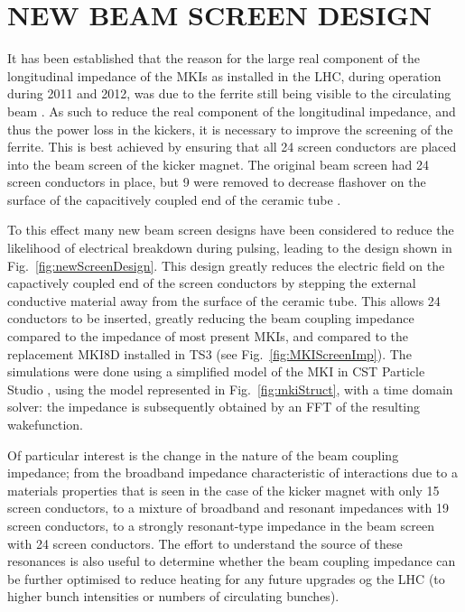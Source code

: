\documentclass{JAC2003}
\begin{document}
\section{NEW BEAM SCREEN DESIGN}

It has been established that the reason for the large real component of the longitudinal impedance of the MKIs as installed in the LHC, during operation during 2011 and 2012, was due to the ferrite still being visible to the circulating beam \cite{kicker_meas}. As such to reduce the real component of the longitudinal impedance, and thus the power loss in the kickers, it is necessary to improve the screening of the ferrite. This is best achieved by ensuring that all 24 screen conductors are placed into the beam screen of the kicker magnet. The original beam screen had 24 screen conductors in place, but 9 were removed to decrease flashover on the surface of the capacitively coupled end of the ceramic tube \cite{mki-ElecBreakdown}. 

To this effect many new beam screen designs have been considered to reduce the likelihood of electrical breakdown during pulsing, leading to the design shown in Fig.~\ref{fig:newScreenDesign}. This design greatly reduces the electric field on the capactively coupled end of the screen conductors by stepping the external conductive material away from the surface of the ceramic tube. This allows 24 conductors to be inserted, greatly reducing the beam coupling impedance compared to the impedance of most present MKIs, and compared to the replacement MKI8D installed in TS3 (see Fig.~\ref{fig:MKIScreenImp}). The simulations were done using a simplified model of the MKI in CST Particle Studio \cite{cst-cite}, using the model represented in Fig.~\ref{fig:mkiStruct}, with a time domain solver: the impedance is subsequently obtained by an FFT of the resulting wakefunction. 

Of particular interest is the change in the nature of the beam coupling impedance; from the broadband impedance characteristic of interactions due to a materials properties that is seen in the case of the kicker magnet with only 15 screen conductors, to a mixture of broadband and resonant impedances with 19 screen conductors, to a strongly resonant-type impedance in the beam screen with 24 screen conductors. The effort to understand the source of these resonances is also useful to determine whether the beam coupling impedance can be further optimised to reduce heating for any future upgrades og the LHC (to higher bunch intensities or numbers of circulating bunches).
\end{document}
